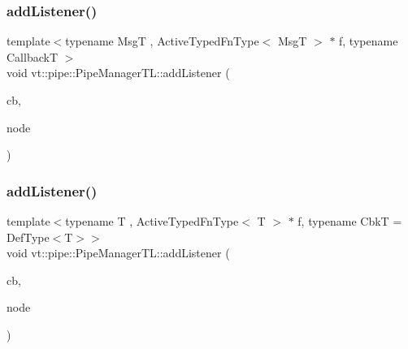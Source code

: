 \subsubsection{\texorpdfstring{add\+Listener()}{addListener()}\hspace{0.1cm}{\footnotesize\ttfamily [1/2]}}
{\footnotesize\ttfamily template$<$typename MsgT , Active\+Typed\+Fn\+Type$<$ Msg\+T $>$ $\ast$ f, typename CallbackT $>$ \\
void vt\+::pipe\+::\+Pipe\+Manager\+T\+L\+::add\+Listener (\begin{DoxyParamCaption}\item[{CallbackT const \&}]{cb,  }\item[{\hyperlink{namespacevt_a866da9d0efc19c0a1ce79e9e492f47e2}{Node\+Type} const \&}]{node }\end{DoxyParamCaption})}

\mbox{\label{structvt_1_1pipe_1_1_pipe_manager_t_l_a379d983dfbf654ed01281d96148175f3}} 
\subsubsection{\texorpdfstring{add\+Listener()}{addListener()}\hspace{0.1cm}{\footnotesize\ttfamily [2/2]}}
{\footnotesize\ttfamily template$<$typename T , Active\+Typed\+Fn\+Type$<$ T $>$ $\ast$ f, typename CbkT  = Def\+Type$<$\+T$>$$>$ \\
void vt\+::pipe\+::\+Pipe\+Manager\+T\+L\+::add\+Listener (\begin{DoxyParamCaption}\item[{CbkT const \&}]{cb,  }\item[{\hyperlink{namespacevt_a866da9d0efc19c0a1ce79e9e492f47e2}{Node\+Type} const \&}]{node }\end{DoxyParamCaption})}

\mbox{\label{structvt_1_1pipe_1_1_pipe_manager_t_l_af50d2867536e0b9db56560126c3da066}} 
